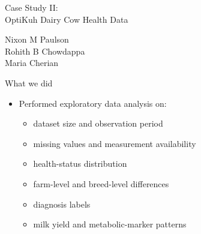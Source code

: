 
{
\begin{frame}[noframenumbering]

\vspace{1.9cm}

\begin{center}
    {\fontsize{25}{29}\selectfont \color{tugreen}
    Case Study II:\\[0.25cm]
    OptiKuh Dairy Cow Health Data}
\end{center}

\vspace{0.95cm}

\begin{flushleft}
{\large
Nixon M Paulson\\
Rohith B Chowdappa\\
Maria Cherian}
\end{flushleft}

\end{frame}
}

\begin{frame}{What we did}

\begin{itemize}
    \item Performed exploratory data analysis on:
    \begin{itemize}
        \item dataset size and observation period
        \item missing values and measurement availability
        \item health-status distribution
        \item farm-level and breed-level differences
        \item diagnosis labels
        \item milk yield and metabolic-marker patterns
    \end{itemize}
\end{itemize}

\end{frame}

